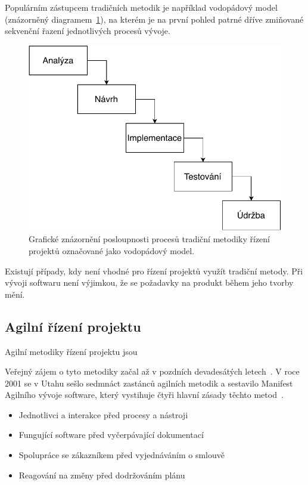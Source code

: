 Populárním zástupcem tradičních metodik je například vodopádový model (znázorněný diagramem~\ref{img:waterfall}), na kterém je na první pohled patrné dříve zmiňované sekvenční řazení jednotlivých procesů vývoje.

\begin{figure}[H]
	\centering
	\includegraphics[width=\textwidth]{obrazky-figures/waterfall.pdf}
	\caption{Grafické znázornění posloupnosti procesů tradiční metodiky řízení projektů označované jako vodopádový model.}
	\label{img:waterfall}
\end{figure}

Existují případy, kdy není vhodné pro řízení projektů využít tradiční metody.
\blindtext
Při vývoji softwaru není výjimkou, že se požadavky na produkt během jeho tvorby mění. 

\subsection{Agilní řízení projektu}
Agilní metodiky řízení projektu jsou \blindtext

Veřejný zájem o tyto metodiky začal až v pozdních devadesátých letech~\cite{bib:agile-mobile}. V roce 2001 se v Utahu sešlo sedmnáct zastánců agilních metodik a sestavilo Manifest Agilního vývoje software, který vystihuje čtyři hlavní zásady těchto metod~\cite{bib:agile-manifest}.
\begin{itemize}
  \item Jednotlivci a interakce před procesy a nástroji
  \item Fungující software před vyčerpávající dokumentací
  \item Spolupráce se zákazníkem před vyjednáváním o smlouvě
  \item Reagování na změny před dodržováním plánu
\end{itemize}

